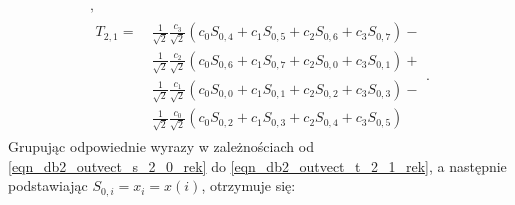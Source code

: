 \begin{gather}
\label{eqn_db2_outvect_t_2_0_rek}, \\
\begin{split}
T_{2,1} = ~
	& \frac{1}{\sqrt{2}} \frac{c_{3}}{\sqrt{2}} \left( c_{0} S_{0,4} + c_{1} S_{0,5} + c_{2} S_{0,6} + c_{3} S_{0,7} \right) - \\
	& \frac{1}{\sqrt{2}} \frac{c_{2}}{\sqrt{2}} \left( c_{0} S_{0,6} + c_{1} S_{0,7} + c_{2} S_{0,0} + c_{3} S_{0,1} \right) + \\
	& \frac{1}{\sqrt{2}} \frac{c_{1}}{\sqrt{2}} \left( c_{0} S_{0,0} + c_{1} S_{0,1} + c_{2} S_{0,2} + c_{3} S_{0,3} \right) - \\
	& \frac{1}{\sqrt{2}} \frac{c_{0}}{\sqrt{2}} \left( c_{0} S_{0,2} + c_{1} S_{0,3} + c_{2} S_{0,4} + c_{3} S_{0,5} \right)
\end{split}
\label{eqn_db2_outvect_t_2_1_rek}.
\end{gather}
Grupując odpowiednie wyrazy w zależnościach od \eqref{eqn_db2_outvect_s_2_0_rek} do \eqref{eqn_db2_outvect_t_2_1_rek}, a następnie podstawiając $S_{0,i} = x_{i} = x(i)$, otrzymuje się:
